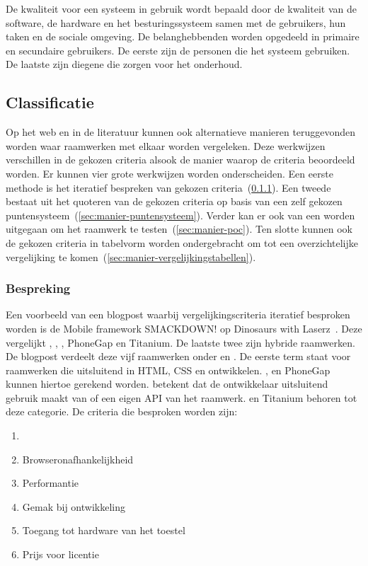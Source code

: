 De kwaliteit voor een systeem in gebruik wordt bepaald door de kwaliteit van de software,  de hardware en het besturingssysteem samen met de gebruikers, hun taken en de sociale omgeving.  
De belanghebbenden worden opgedeeld in primaire en secundaire gebruikers.  
De eerste zijn de personen die het systeem gebruiken. 
De laatste zijn diegene die zorgen voor het onderhoud.

\subsection{Classificatie}
\label{sec:vergelijken-classificatie}
Op het web en in de literatuur kunnen ook alternatieve manieren teruggevonden worden waar raamwerken met elkaar worden vergeleken.  
Deze werkwijzen verschillen in de gekozen criteria alsook de manier waarop de criteria beoordeeld worden.
Er kunnen vier grote werkwijzen worden onderscheiden.
Een eerste methode is het iteratief bespreken van gekozen criteria~(\ref{sec:manier-bespreken}).
Een tweede bestaat uit het quoteren van de gekozen criteria op basis van een zelf gekozen puntensysteem~(\ref{sec:manier-puntensysteem}).
Verder kan er ook van een  worden uitgegaan om het raamwerk te testen~(\ref{sec:manier-poc}).
Ten slotte kunnen ook de gekozen criteria in tabelvorm worden ondergebracht om tot een overzichtelijke vergelijking te komen~(\ref{sec:manier-vergelijkingstabellen}).

\subsubsection{Bespreking}
\label{sec:manier-bespreken}
Een voorbeeld van een blogpost waarbij vergelijkingscriteria iteratief besproken worden is de Mobile framework SMACKDOWN! op Dinosaurs with Laserz~\cite{Rozynski2011}.
Deze vergelijkt \jqt{},  \jqm{},  \st{},  PhoneGap en Titanium.  
De laatste twee zijn hybride raamwerken.
De blogpost verdeelt deze vijf raamwerken onder  en .
De eerste term staat voor raamwerken die uitsluitend in HTML, CSS en \js{} ontwikkelen. 
\jqt{},  \jqm{} en PhoneGap kunnen hiertoe gerekend worden.
 betekent dat de ontwikkelaar uitsluitend gebruik maakt van \js{} of een eigen API van het raamwerk.
\st{} en Titanium behoren tot deze categorie.
De criteria die besproken worden zijn:
\begin{enumerate}
 \item {}
 \item Browseronafhankelijkheid
 \item Performantie
 \item Gemak bij ontwikkeling
 \item Toegang tot hardware van het toestel
 \item Prijs voor licentie
\end{enumerate}

